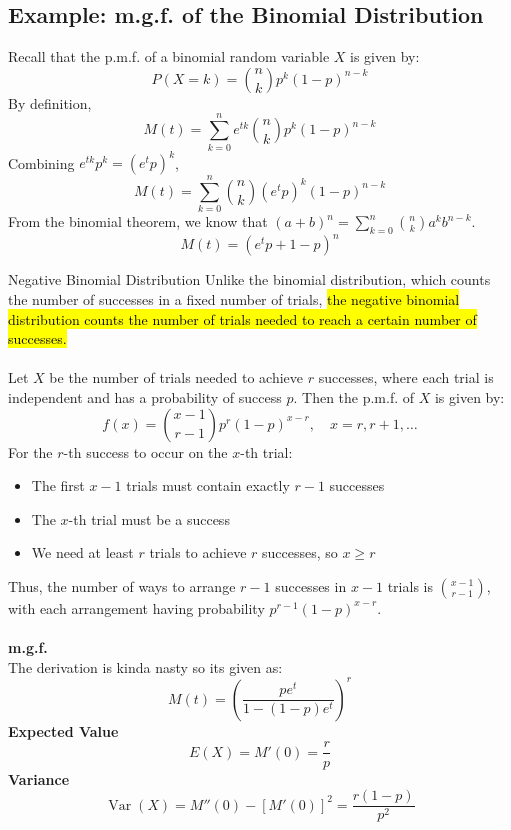﻿\documentclass[12pt]{article}
\begin{document}
\subsection*{Example: m.g.f. of the Binomial Distribution}
Recall that the p.m.f. of a binomial random variable $X$ is given by:
\[
P(X=k)=\binom nk p^k(1-p)^{n-k}
\]
By definition,
\[
M(t)=\sum_{k=0}^{n}e^{tk}\binom nk p^k(1-p)^{n-k}
\]
Combining \(e^{tk}p^k=(e^t p)^k\),
\[
M(t)=\sum_{k=0}^{n}\binom nk(e^t p)^k(1-p)^{n-k}
\]
From the binomial theorem, we know that $(a+b)^n = \sum_{k=0}^{n} \binom{n}{k} a^k b^{n-k}$.
\[
\boxed{M(t)=(e^tp+1-p)^n}
\]
\begin{definition}{Negative Binomial Distribution}
    Unlike the binomial distribution, which counts the number of successes in a fixed number of trials, \hl{the negative binomial distribution counts the number of trials needed to reach a certain number of successes.}\\\\
    Let $X$ be the number of trials needed to achieve $r$ successes, where each trial is independent and has a probability of success $p$. Then the p.m.f. of $X$ is given by:
    \[\boxed{f(x)=\binom{x-1}{r-1}p^r(1-p)^{x-r},\quad x=r,r+1,\ldots}\]
    For the $r$-th success to occur on the $x$-th trial:
    \begin{itemize}
        \item The first $x-1$ trials must contain exactly $r-1$ successes
        \item The $x$-th trial must be a success
        \item We need at least $r$ trials to achieve $r$ successes, so $x \geq r$
    \end{itemize}
    Thus, the number of ways to arrange $r-1$ successes in $x-1$ trials is $\binom{x-1}{r-1}$, with each arrangement having probability $p^{r-1}(1-p)^{x-r}$.\\\\
    \textbf{m.g.f.}\\
    The derivation is kinda nasty so its given as:
    \[M(t) = \left(\frac{pe^t}{1-(1-p)e^t}\right)^r\]
    \textbf{Expected Value}\\
    \[E(X) = M'(0) = \frac{r}{p}\]
    \textbf{Variance}\\
    \[\operatorname{Var}(X) = M''(0) - [M'(0)]^2 = \frac{r(1-p)}{p^2}\]
\end{definition}
\end{document}
